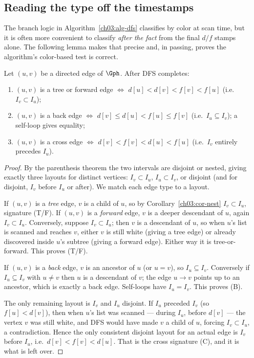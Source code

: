 \subsection{Reading the type off the timestamps}

The branch logic in Algorithm~\ref{ch03:alg-dfs} classifies by color at scan time, but it is often more convenient to classify \emph{after the fact} from the final $d/f$ stamps alone. The following lemma makes that precise and, in passing, proves the algorithm's color-based test is correct.

\begin{lemma}\label{ch03:lem-signature}
Let $(u,v)$ be a directed edge of $\Gph$. After DFS completes:
\begin{enumerate}
  \item[(T/F)] $(u,v)$ is a tree or forward edge $\iff$ $d[u]<d[v]<f[v]<f[u]$ (i.e.\ $I_v\subset I_u$);
  \item[(B)] $(u,v)$ is a back edge $\iff$ $d[v]\le d[u]<f[u]\le f[v]$ (i.e.\ $I_u\subseteq I_v$); a self-loop gives equality;
  \item[(C)] $(u,v)$ is a cross edge $\iff$ $d[v]<f[v]<d[u]<f[u]$ (i.e.\ $I_v$ entirely precedes $I_u$).
\end{enumerate}
\end{lemma}

\begin{proof}
By the parenthesis theorem the two intervals are disjoint or nested, giving exactly three layouts for distinct vertices: $I_v\subset I_u$, $I_u\subset I_v$, or disjoint (and for disjoint, $I_v$ before $I_u$ or after). We match each edge type to a layout.

If $(u,v)$ is a \emph{tree} edge, $v$ is a child of $u$, so by Corollary~\ref{ch03:cor-nest} $I_v\subset I_u$, signature (T/F). If $(u,v)$ is a \emph{forward} edge, $v$ is a deeper descendant of $u$, again $I_v\subset I_u$. Conversely, suppose $I_v\subset I_u$; then $v$ is a descendant of $u$, so when $u$'s list is scanned and reaches $v$, either $v$ is still white (giving a tree edge) or already discovered inside $u$'s subtree (giving a forward edge). Either way it is tree-or-forward. This proves (T/F).

If $(u,v)$ is a \emph{back} edge, $v$ is an ancestor of $u$ (or $u=v$), so $I_u\subseteq I_v$. Conversely if $I_u\subseteq I_v$ with $u\ne v$ then $u$ is a descendant of $v$; the edge $u\to v$ points up to an ancestor, which is exactly a back edge. Self-loops have $I_u=I_v$. This proves (B).

The only remaining layout is $I_v$ and $I_u$ disjoint. If $I_u$ preceded $I_v$ (so $f[u]<d[v]$), then when $u$'s list was scanned --- during $I_u$, before $d[v]$ --- the vertex $v$ was still white, and DFS would have made $v$ a child of $u$, forcing $I_v\subset I_u$, a contradiction. Hence the only consistent disjoint layout for an actual edge is $I_v$ before $I_u$, i.e.\ $d[v]<f[v]<d[u]$. That is the cross signature (C), and it is what is left over.
\end{proof}

